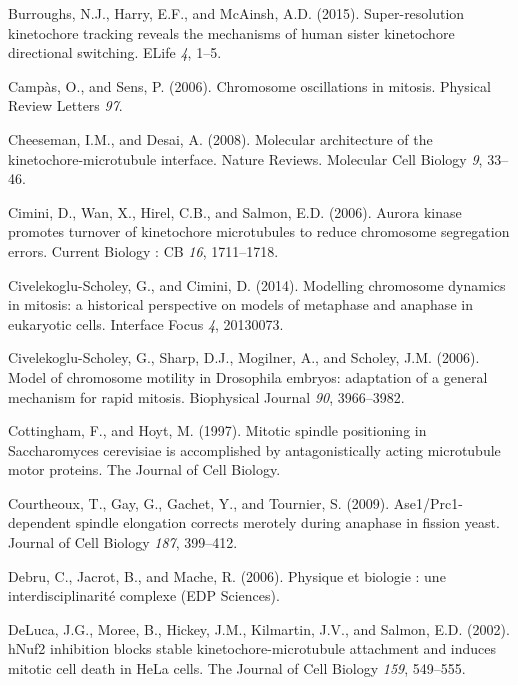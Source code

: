 \documentclass[12pt,a4paper,twoside,openright]{book}
\begin{document}
Burroughs, N.J., Harry, E.F., and McAinsh, A.D. (2015). Super-resolution
kinetochore tracking reveals the mechanisms of human sister kinetochore
directional switching. ELife \emph{4}, 1--5.

Campàs, O., and Sens, P. (2006). Chromosome oscillations in mitosis.
Physical Review Letters \emph{97}.

Cheeseman, I.M., and Desai, A. (2008). Molecular architecture of the
kinetochore-microtubule interface. Nature Reviews. Molecular Cell
Biology \emph{9}, 33--46.

Cimini, D., Wan, X., Hirel, C.B., and Salmon, E.D. (2006). Aurora kinase
promotes turnover of kinetochore microtubules to reduce chromosome
segregation errors. Current Biology : CB \emph{16}, 1711--1718.

Civelekoglu-Scholey, G., and Cimini, D. (2014). Modelling chromosome
dynamics in mitosis: a historical perspective on models of metaphase and
anaphase in eukaryotic cells. Interface Focus \emph{4}, 20130073.

Civelekoglu-Scholey, G., Sharp, D.J., Mogilner, A., and Scholey, J.M.
(2006). Model of chromosome motility in Drosophila embryos: adaptation
of a general mechanism for rapid mitosis. Biophysical Journal \emph{90},
3966--3982.

Cottingham, F., and Hoyt, M. (1997). Mitotic spindle positioning in
Saccharomyces cerevisiae is accomplished by antagonistically acting
microtubule motor proteins. The Journal of Cell Biology.

Courtheoux, T., Gay, G., Gachet, Y., and Tournier, S. (2009).
Ase1/Prc1-dependent spindle elongation corrects merotely during anaphase
in fission yeast. Journal of Cell Biology \emph{187}, 399--412.

Debru, C., Jacrot, B., and Mache, R. (2006). Physique et biologie : une
interdisciplinarité complexe (EDP Sciences).

DeLuca, J.G., Moree, B., Hickey, J.M., Kilmartin, J.V., and Salmon, E.D.
(2002). hNuf2 inhibition blocks stable kinetochore-microtubule
attachment and induces mitotic cell death in HeLa cells. The Journal of
Cell Biology \emph{159}, 549--555.
\end{document}
